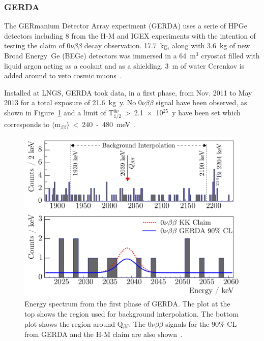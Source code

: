 \documentclass[main.tex]{subfiles}
\begin{document}
\subsubsection{GERDA}


\NI The GERmanium Detector Array experiment (GERDA) uses a serie of HPGe detectors including 8 from the H-M and IGEX experiments with the intention of testing the claim of 0$\nu\beta\beta$ decay observation. 17.7~kg, along with 3.6~kg of new Broad Energy~Ge (BEGe) detectors was immersed in a 64~m$^\text{3}$ cryostat filled with liquid argon acting as a coolant and as a shielding. 3~m of water Cerenkov is added around to veto cosmic muons~\cite{GERDA}.


\bigskip 


\NI Installed at LNGS, GERDA took data, in a first phase, from Nov. 2011 to May 2013 for a total exposure of 21.6~kg~y. No 0$\nu\beta\beta$ signal have been observed, as shown in Figure~\ref{GERDAresults} and a limit of T$_{\text{1/2}}^{0\nu}$~>~2.1~$\times$~10$^{\text{25}}$~y have been set which corresponds to $\langle \text{m}_{\beta\beta} \rangle$~<~240~-~480~meV~\cite{GERDA}.


\begin{figure}[h!]
\begin{center}
\includegraphics[scale=0.3]{pictures/Chap2/GERDAresults.png}
\caption{Energy spectrum from the first phase of GERDA. The plot at the top shows the region used for background interpolation. The bottom plot shows the region around Q$_{\beta\beta}$. The 0$\nu\beta\beta$ signals for the 90\% CL from GERDA and the H-M claim are also shown~\cite{GERDA}.}
\label{GERDAresults}
\end{center}
\end{figure}
\end{document}
